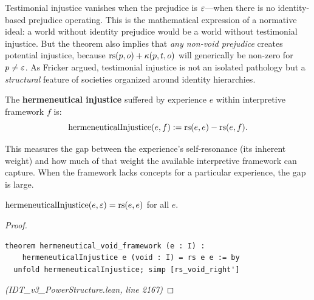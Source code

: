 \begin{interpretation}
Testimonial injustice vanishes when the prejudice is $\varepsilon$---when there
is no identity-based prejudice operating. This is the mathematical expression
of a normative ideal: a world without identity prejudice would be a world
without testimonial injustice. But the theorem also implies that
\emph{any non-void prejudice} creates potential injustice, because
$\mathrm{rs}(p,o) + \kappa(p,t,o)$ will generically be non-zero for $p \neq \varepsilon$.
As Fricker argued, testimonial injustice is not an isolated pathology but a
\emph{structural} feature of societies organized around identity hierarchies.
\end{interpretation}

\begin{definition}
\label{def:hermeneutical-injustice}
The \textbf{hermeneutical injustice} suffered by experience $e$ within
interpretive framework $f$ is:
\[
  \mathrm{hermeneuticalInjustice}(e, f) := \mathrm{rs}(e, e) - \mathrm{rs}(e, f).
\]
\end{definition}

This measures the gap between the experience's self-resonance (its inherent
weight) and how much of that weight the available interpretive framework can
capture. When the framework lacks concepts for a particular experience, the
gap is large.

\begin{theorem}
\label{thm:hermeneutical-void}
$\mathrm{hermeneuticalInjustice}(e, \varepsilon) = \mathrm{rs}(e, e)$ for all $e$.
\end{theorem}

\begin{proof}
\begin{lstlisting}
theorem hermeneutical_void_framework (e : I) :
    hermeneuticalInjustice e (void : I) = rs e e := by
  unfold hermeneuticalInjustice; simp [rs_void_right']
\end{lstlisting}
\textit{(IDT\_v3\_PowerStructure.lean, line 2167)}
\end{proof}


